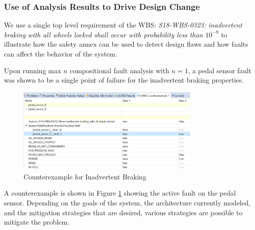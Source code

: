 \begin{enumerate}
\end{enumerate}

\subsubsection{Use of Analysis Results to Drive Design Change}
\label{sec:designChange}
We use a single top level requirement of the WBS: {\em S18-WBS-0323: inadvertent braking with all wheels locked shall occur with probability less than $10^{-9}$} to illustrate how the safety annex can be used to detect design flaws and how faults can affect the behavior of the system. 

Upon running max $n$ compositional fault analysis with $n = 1$, a pedal sensor fault was shown to be a single point of failure for the inadvertent braking properties. 
\begin{figure}[htbp]
	\begin{center}
		\includegraphics[width=0.8\textwidth]{images/counterexample.png}
	\end{center}
	\vspace{-0.3in}
	\caption{Counterexample for Inadvertent Braking}
	\label{fig:counterexample}
\end{figure} 
A counterexample is shown in Figure \ref{fig:counterexample} showing the active fault on the pedal sensor. Depending on the goals of the system, the architecture currently modeled, and the mitigation strategies that are desired, various strategies are possible to mitigate the problem.

